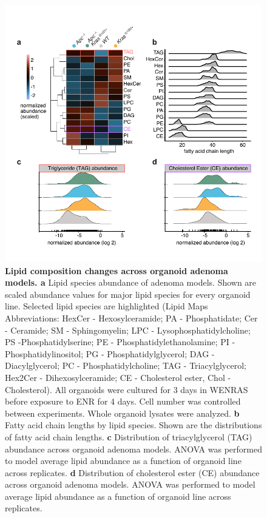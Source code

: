 \begin{flushleft}
\begin{figure}[h]
\centering
\includegraphics[width=350pt,
                height=\textheight,
                keepaspectratio]{figures/adenomaprofiling/pdf/fig_1_6_8.pdf}
\caption[Lipid composition changes across organoid adenoma models]{\textbf{Lipid composition changes across organoid adenoma models. a} Lipid species abundance of adenoma models. Shown are scaled abundance values for major lipid species for every organoid line. Selected lipid species are highlighted (Lipid Maps Abbreviations: HexCer - Hexosylceramide; PA - Phosphatidate; Cer - Ceramide; SM - Sphingomyelin; LPC - Lysophosphatidylcholine; PS -Phosphatidylserine; PE - Phosphatidylethanolamine; PI - Phosphatidylinositol; PG - Phosphatidylglycerol; DAG - Diacylglycerol; PC - Phosphatidylcholine; TAG - Triacylglycerol; Hex2Cer - Dihexosylceramide; CE - Cholesterol ester, Chol - Cholesterol). All organoids were cultured for 3 days in WENRAS before exposure to ENR for 4 days. Cell number was controlled between experiments. Whole organoid lysates were analyzed. 
\textbf{b} Fatty acid chain lengths by lipid species. Shown are the distributions of fatty acid chain lengths.
\textbf{c} Distribution of triacylglycerol (TAG) abundance across organoid adenoma models. ANOVA was performed to model average lipid abundance as a function of organoid line across replicates.
\textbf{d} Distribution of cholesterol ester (CE) abundance across organoid adenoma models. ANOVA was performed to model average lipid abundance as a function of organoid line across replicates.
}
\label{fig_168}
\end{figure}
\bigbreak



\end{flushleft}
